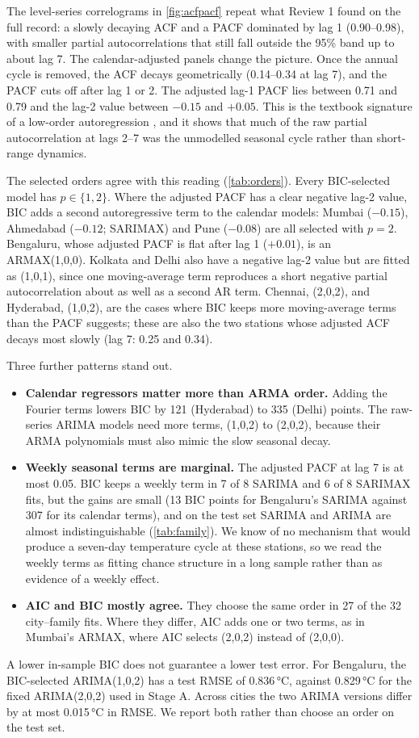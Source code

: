 \documentclass[11pt,a4paper]{article}
\newcommand{\degC}{\,\si{\degreeCelsius}}
\begin{document}
The level-series correlograms in \cref{fig:acfpacf} repeat what Review 1 found on the full record: a slowly decaying ACF and a PACF dominated by lag 1 (0.90--0.98), with smaller partial autocorrelations that still fall outside the 95\% band up to about lag 7. The calendar-adjusted panels change the picture. Once the annual cycle is removed, the ACF decays geometrically (0.14--0.34 at lag 7), and the PACF cuts off after lag 1 or 2. The adjusted lag-1 PACF lies between 0.71 and 0.79 and the lag-2 value between $-0.15$ and $+0.05$. This is the textbook signature of a low-order autoregression \citep{box2015time}, and it shows that much of the raw partial autocorrelation at lags 2--7 was the unmodelled seasonal cycle rather than short-range dynamics.

The selected orders agree with this reading (\cref{tab:orders}). Every BIC-selected model has $p \in \{1, 2\}$. Where the adjusted PACF has a clear negative lag-2 value, BIC adds a second autoregressive term to the calendar models: Mumbai ($-0.15$), Ahmedabad ($-0.12$; SARIMAX) and Pune ($-0.08$) are all selected with $p = 2$. Bengaluru, whose adjusted PACF is flat after lag 1 ($+0.01$), is an ARMAX(1,0,0). Kolkata and Delhi also have a negative lag-2 value but are fitted as (1,0,1), since one moving-average term reproduces a short negative partial autocorrelation about as well as a second AR term. Chennai, (2,0,2), and Hyderabad, (1,0,2), are the cases where BIC keeps more moving-average terms than the PACF suggests; these are also the two stations whose adjusted ACF decays most slowly (lag 7: 0.25 and 0.34).

Three further patterns stand out.
\begin{itemize}
  \item \textbf{Calendar regressors matter more than ARMA order.} Adding the Fourier terms lowers BIC by 121 (Hyderabad) to 335 (Delhi) points. The raw-series ARIMA models need more terms, (1,0,2) to (2,0,2), because their ARMA polynomials must also mimic the slow seasonal decay.
  \item \textbf{Weekly seasonal terms are marginal.} The adjusted PACF at lag 7 is at most 0.05. BIC keeps a weekly term in 7 of 8 SARIMA and 6 of 8 SARIMAX fits, but the gains are small (13 BIC points for Bengaluru's SARIMA against 307 for its calendar terms), and on the test set SARIMA and ARIMA are almost indistinguishable (\cref{tab:family}). We know of no mechanism that would produce a seven-day temperature cycle at these stations, so we read the weekly terms as fitting chance structure in a long sample rather than as evidence of a weekly effect.
  \item \textbf{AIC and BIC mostly agree.} They choose the same order in 27 of the 32 city--family fits. Where they differ, AIC adds one or two terms, as in Mumbai's ARMAX, where AIC selects (2,0,2) instead of (2,0,0).
\end{itemize}
A lower in-sample BIC does not guarantee a lower test error. For Bengaluru, the BIC-selected ARIMA(1,0,2) has a test RMSE of 0.836\degC, against 0.829\degC{} for the fixed ARIMA(2,0,2) used in Stage A. Across cities the two ARIMA versions differ by at most 0.015\degC{} in RMSE. We report both rather than choose an order on the test set.
\end{document}
